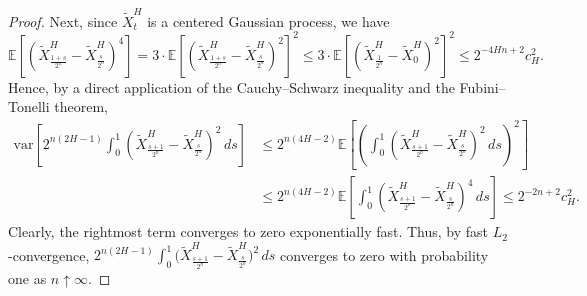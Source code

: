 \documentclass[12pt,reqno]{article}
\def\ua{\uparrow}
\def\wt{\widetilde}
\numberwithin{equation}{section}
\def\var{\mbox{var}}
\theoremstyle{definition}
\def\wt#1{\widetilde{#1}}
\def\ua{\uparrow}
\def\wt{\widetilde}
\newcommand{\bE}{\mathbb{E}}
\begin{document}
\begin{proof}
	Next, since $\wt X^H_t$ is a centered Gaussian process, we have  
	\begin{equation*}
		\bE\left[\left(\wt X^H_{\frac{1+s}{2^n}} - \wt X^H_\frac{s}{2^n}\right)^4\right] = 3\cdot \bE\left[\left(\wt X^H_{\frac{1+s}{2^n}} - \wt X^H_\frac{s}{2^n}\right)^2\right]^2 \le 3\cdot\bE\left[\left(\wt X^H_{\frac{1}{2^n}} - \wt X^H_0\right)^2\right]^2 \le  2^{-4Hn+2}c^2_H.
	\end{equation*}
	Hence, by a direct application of the Cauchy--Schwarz inequality and the Fubini--Tonelli theorem, 
	\begin{equation*}
		\begin{split}
			\var\left[2^{n(2H-1)}\int_0^{1}\left(\wt X^H_{\frac{s+1}{2^n}} - \wt X^H_{\frac{s}{2^n}}\right)^2\,ds\right] &\le2^{n(4H-2)} \bE\left[\left(\int_0^{1}\left(\wt X^H_{\frac{s+1}{2^n}} - \wt X^H_{\frac{s}{2^n}}\right)^2\,ds\right)^2\right]\\&\le 2^{n(4H-2)}\bE\left[\int_0^{1}\left(\wt X^H_{\frac{s+1}{2^n}} - \wt X^H_{\frac{s}{2^n}}\right)^4\,ds\right]  \le 2^{-2n+2}c_H^2.
		\end{split}
	\end{equation*}
	Clearly, the rightmost term converges to zero exponentially fast. Thus, by fast $L_2$-convergence, $2^{n(2H-1)}\int_0^{1}\big(\wt X^H_{\frac{s+1}{2^n}} - \wt X^H_{\frac{s}{2^n}}\big)^2\,ds$ converges to zero with probability one as $n \ua \infty$. 
	

\end{proof}
\end{document}
